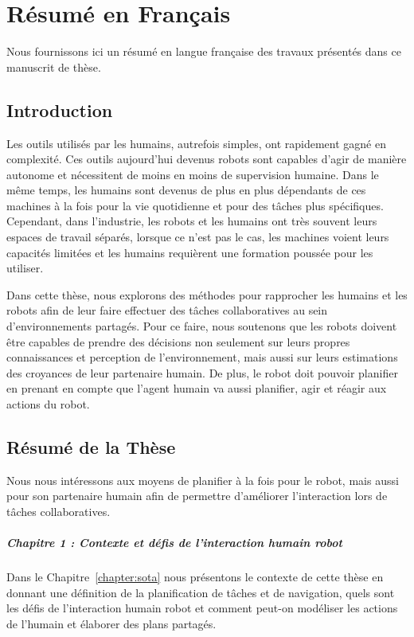 \chapter{Résumé en Français}
\label{annex:frenchversion}
Nous fournissons ici un résumé en langue française des travaux présentés dans ce manuscrit de thèse.

\section*{Introduction}
Les outils utilisés par les humains, autrefois simples, ont rapidement gagné en complexité. Ces outils aujourd'hui devenus robots sont capables d'agir de manière autonome et nécessitent de moins en moins de supervision humaine. Dans le même temps, les humains sont devenus de plus en plus dépendants de ces machines à la fois pour la vie quotidienne et pour des tâches plus spécifiques. Cependant, dans l'industrie, les robots et les humains ont très souvent leurs espaces de travail séparés, lorsque ce n'est pas le cas, les machines voient leurs capacités limitées et les humains requièrent une formation poussée pour les utiliser.

Dans cette thèse, nous explorons des méthodes pour rapprocher les humains et les robots afin de leur faire effectuer des tâches collaboratives au sein d’environnements partagés. Pour ce faire, nous soutenons que les robots doivent être capables de prendre des décisions non seulement sur leurs propres connaissances et perception de l’environnement, mais aussi sur leurs estimations des croyances de leur partenaire humain. De plus, le robot doit pouvoir planifier en prenant en compte que l'agent humain va aussi planifier, agir et réagir aux actions du robot.

\section*{Résumé de la Thèse}
Nous nous intéressons aux moyens de planifier à la fois pour le robot, mais aussi pour son partenaire humain afin de permettre d'améliorer l'interaction lors de tâches collaboratives. 

\paragraph{Chapitre 1 : Contexte et défis de l'interaction humain robot}
Dans le Chapitre~\ref{chapter:sota} nous présentons le contexte de cette thèse en donnant une définition de la planification de tâches et de navigation, quels sont les défis de l'interaction humain robot et comment peut-on modéliser les actions de l'humain et élaborer des plans partagés. 

